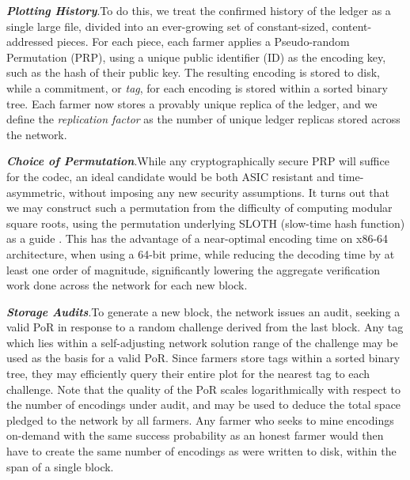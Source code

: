 \documentclass[conference]{IEEEtran}
\begin{document}
\vspace{2mm}

\noindent \textbf{\textit{Plotting History}}.\quad To do this, we treat the confirmed history of the ledger as a single large file, divided into an ever-growing set of constant-sized, content-addressed pieces. For each piece, each farmer applies a Pseudo-random Permutation (PRP), using a unique public identifier (ID) as the encoding key, such as the hash of their public key. The resulting encoding is stored to disk, while a commitment, or \textit{tag}, for each encoding is stored within a sorted binary tree. Each farmer now stores a provably unique replica of the ledger, and we define the \textit{replication factor} as the number of unique ledger replicas stored across the network.

\vspace{2mm}

\noindent \textbf{\textit{Choice of Permutation}}.\quad While any cryptographically secure PRP will suffice for the codec, an ideal candidate would be both ASIC resistant and time-asymmetric, without imposing any new security assumptions. It turns out that we may construct such a permutation from the difficulty of computing modular square roots, using the permutation underlying SLOTH (slow-time hash function) as a guide \cite{lenstra2015random}. This has the advantage of a near-optimal encoding time on x86-64 architecture, when using a 64-bit prime, while reducing the decoding time by at least one order of magnitude, significantly lowering the aggregate verification work done across the network for each new block.

\vspace{2mm}

\noindent \textbf{\textit{Storage Audits}}.\quad To generate a new block, the network issues an audit, seeking a valid PoR in response to a random challenge derived from the last block. Any tag which lies within a self-adjusting network solution range of the challenge may be used as the basis for a valid PoR. Since farmers store tags within a sorted binary tree, they may efficiently query their entire plot for the nearest tag to each challenge. Note that the quality of the PoR scales logarithmically with respect to the number of encodings under audit, and may be used to deduce the total space pledged to the network by all farmers. Any farmer who seeks to mine encodings on-demand with the same success probability as an honest farmer would then have to create the same number of encodings as were written to disk, within the span of a single block. 
\end{document}
